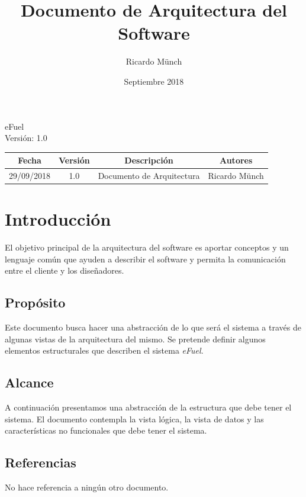 \documentclass{article}
\title{Documento de Arquitectura del Software} \let\Title\@title
\date{Septiembre 2018} \let\Date\@date
\author{Ricardo Münch} \let\Author\@author
\begin{document}
    \begin{titlepage}
    \huge{\Title}
    \begin{flushright}
        \Large{eFuel \\ Versión: 1.0}
    \end{flushright}
    \end{titlepage}

    \newpage
    \tableofcontents

    \newpage
    \begin{center}
        \begin{tabular}{ |c|c|c|c| }
            \hline
            \rowcolor{lightgray}
            Fecha & Versión & Descripción & Autores \\
            \hline
            29/09/2018 & 1.0 & Documento de Arquitectura & Ricardo Münch \\
            \hline
        \end{tabular}
    \end{center}

    \newpage
    \section{Introducción}
    El objetivo principal de la arquitectura del software es aportar conceptos y un lenguaje común que ayuden a describir el software y permita la comunicación entre el cliente y los diseñadores.

    \subsection{Propósito}
    Este documento busca hacer una abstracción de lo que será el sistema a través de algunas vistas de la arquitectura del mismo. Se pretende definir algunos elementos estructurales que describen el sistema \emph{eFuel}.

    \subsection{Alcance}
    A continuación presentamos una abstracción de la estructura que debe tener el sistema. El documento contempla la vista lógica, la vista de datos y las características no funcionales que debe tener el sistema.

    \subsection{Referencias}
    No hace referencia a ningún otro documento.
\end{document}
